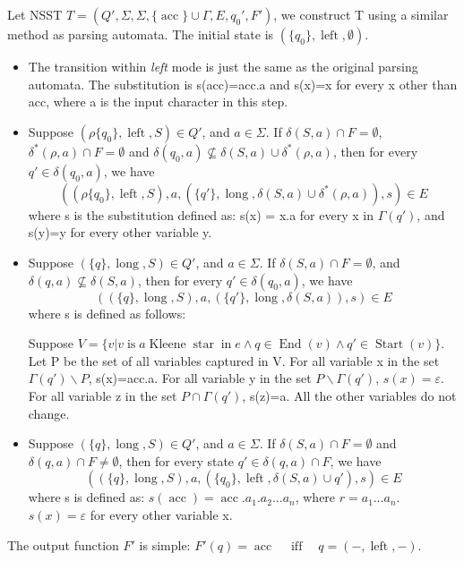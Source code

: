 \documentclass{article}
\newcommand{\tmop}[1]{\ensuremath{\operatorname{#1}}}
\newcommand{\tmtextit}[1]{{\itshape{#1}}}
\begin{document}
Let NSST $T = (Q', \Sigma, \Sigma, \{ \tmop{acc} \} \cup \Gamma, E, q_0',
F')$, we construct T using a similar method as parsing
automata{\cite{chenWhatDecidableString2018}}. The initial state is $(\{ q_0
\}, \tmop{left}, \emptyset)$.
\begin{itemize}
  \item The transition within \tmtextit{left} mode is just the same as the
  original parsing automata. The substitution is s(acc)=acc.a and s(x)=x for
  every x other than acc, where a is the input character in this step.
  
  \item Suppose $(\rho \{ q_0 \}, \tmop{left}, S) \in Q'$, and $a \in \Sigma$.
  If $\delta (S, a) \cap F = \emptyset$, $\delta^{\ast} (\rho, a) \cap F =
  \emptyset$ and $\delta (q_0, a) \nsubseteq \delta (S, a) \cup \delta^{\ast}
  (\rho, a)$, then for every $q' \in \delta (q_0, a)$, we have
  \[ ((\rho \{ q_0 \}, \tmop{left}, S), a, (\{ q' \}, \tmop{long}, \delta (S,
     a) \cup \delta^{\ast} (\rho, a)), s) \in E \]
  where s is the substitution defined as: s(x) = x.a for every x in $\Gamma
  (q')$, and s(y)=y for every other variable y.
  
  \item Suppose $(\{ q \}, \tmop{long}, S) \in Q'$, and $a \in \Sigma$. If
  $\delta (S, a) \cap F = \emptyset$, and \ $\delta (q, a) \nsubseteq \delta
  (S, a)$, then for every $q' \in \delta (q_0, a)$, we have
  \[ ((\{ q \}, \tmop{long}, S), a, (\{ q' \}, \tmop{long}, \delta (S, a)), s)
     \in E \]
  where s is defined as follows:
  
  Suppose $V = \{ v|v \tmop{is} a \tmop{Kleene} \tmop{star} \tmop{in} e \wedge
  q \in \tmop{End} (v) \wedge q' \in \tmop{Start} (v) \}$. Let P be the set of
  all variables captured in V. For all variable x in the set $\Gamma (q')
  \backslash P$, s(x)=acc.a. For all variable y in the set $P\backslash \Gamma
  (q')$, $s (x) = \varepsilon$. For all variable z in the set $P \cap \Gamma
  (q')$, s(z)=a. All the other variables do not change.
  
  \item Suppose $(\{ q \}, \tmop{long}, S) \in Q'$, and $a \in \Sigma$. If
  $\delta (S, a) \cap F = \emptyset$ and $\delta (q, a) \cap F \neq
  \emptyset$, then for every state $q' \in \delta (q, a) \cap F$, we have
  \[ ((\{ q \}, \tmop{long}, S), a, (\{ q_0 \}, \tmop{left}, \delta (S, a)
     \cup q'), s) \in E \]
  where s is defined as: $s (\tmop{acc}) = \tmop{acc} .a_1 .a_2 \ldots a_n$,
  where $r = a_1 \ldots a_n$. $s (x) = \varepsilon$ for every other variable
  x.
\end{itemize}
The output function $F'$ is simple: $F' (q) = \tmop{acc} \quad \tmop{iff}
\quad q = (-, \tmop{left}, -) $.
\end{document}
